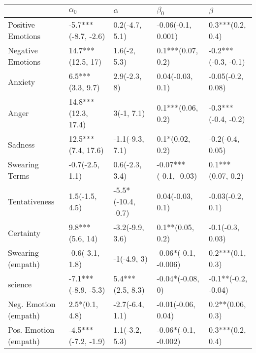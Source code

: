 \begin{tabular}{lllll}
\toprule
{} &           $\alpha_0$ &            $\alpha$ &              $\beta_0$ &              $\beta$ \\
\midrule
Positive Emotions     &  -5.7***(-8.7, -2.6) &      0.2(-4.7, 5.1) &     -0.06(-0.1, 0.001) &     0.3***(0.2, 0.4) \\
Negative Emotions     &    14.7***(12.5, 17) &        1.6(-2, 5.3) &      0.1***(0.07, 0.2) &  -0.2***(-0.3, -0.1) \\
Anxiety               &     6.5***(3.3, 9.7) &        2.9(-2.3, 8) &       0.04(-0.03, 0.1) &    -0.05(-0.2, 0.08) \\
Anger                 &  14.8***(12.3, 17.4) &          3(-1, 7.1) &      0.1***(0.06, 0.2) &  -0.3***(-0.4, -0.2) \\
Sadness               &   12.5***(7.4, 17.6) &     -1.1(-9.3, 7.1) &        0.1*(0.02, 0.2) &     -0.2(-0.4, 0.05) \\
Swearing Terms        &      -0.7(-2.5, 1.1) &      0.6(-2.3, 3.4) &  -0.07***(-0.1, -0.03) &    0.1***(0.07, 0.2) \\
Tentativeness         &       1.5(-1.5, 4.5) &  -5.5*(-10.4, -0.7) &       0.04(-0.03, 0.1) &     -0.03(-0.2, 0.1) \\
Certainty             &      9.8***(5.6, 14) &     -3.2(-9.9, 3.6) &       0.1**(0.05, 0.2) &     -0.1(-0.3, 0.03) \\
Swearing (empath)     &      -0.6(-3.1, 1.8) &         -1(-4.9, 3) &   -0.06*(-0.1, -0.006) &     0.2***(0.1, 0.3) \\
science               &  -7.1***(-8.9, -5.3) &    5.4***(2.5, 8.3) &       -0.04*(-0.08, 0) &  -0.1**(-0.2, -0.04) \\
Neg. Emotion (empath) &       2.5*(0.1, 4.8) &     -2.7(-6.4, 1.1) &     -0.01(-0.06, 0.04) &     0.2**(0.06, 0.3) \\
Pos. Emotion (empath) &  -4.5***(-7.2, -1.9) &      1.1(-3.2, 5.3) &   -0.06*(-0.1, -0.002) &     0.3***(0.2, 0.4) \\
\bottomrule
\end{tabular}
